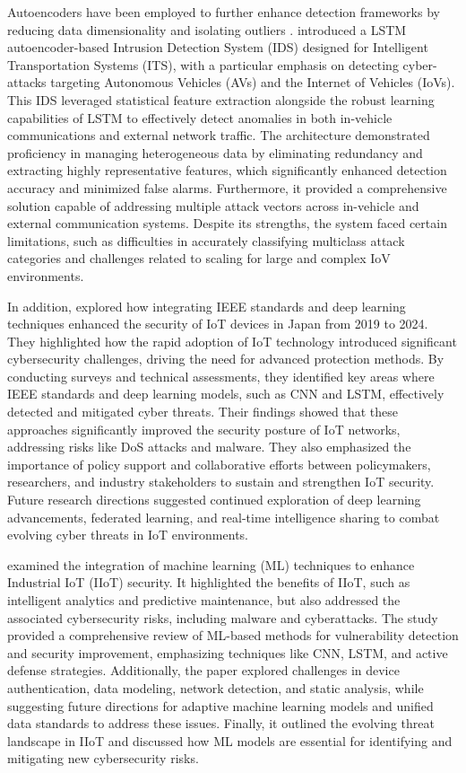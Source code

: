 Autoencoders have been employed to further enhance detection frameworks by reducing data dimensionality and isolating outliers \cite{bensaoud2024survey}. \citet{ashraf2020novel} introduced a LSTM autoencoder-based Intrusion Detection System (IDS) designed for Intelligent Transportation Systems (ITS), with a particular emphasis on detecting cyber-attacks targeting Autonomous Vehicles (AVs) and the Internet of Vehicles (IoVs). This IDS leveraged statistical feature extraction alongside the robust learning capabilities of LSTM to effectively detect anomalies in both in-vehicle communications and external network traffic. The architecture demonstrated proficiency in managing heterogeneous data by eliminating redundancy and extracting highly representative features, which significantly enhanced detection accuracy and minimized false alarms. Furthermore, it provided a comprehensive solution capable of addressing multiple attack vectors across in-vehicle and external communication systems. Despite its strengths, the system faced certain limitations, such as difficulties in accurately classifying multiclass attack categories and challenges related to scaling for large and complex IoV environments.

In addition, \citet{prince2024ieee} explored how integrating IEEE standards and deep learning techniques enhanced the security of IoT devices in Japan from 2019 to 2024. They highlighted how the rapid adoption of IoT technology introduced significant cybersecurity challenges, driving the need for advanced protection methods. By conducting surveys and technical assessments, they identified key areas where IEEE standards and deep learning models, such as CNN and LSTM, effectively detected and mitigated cyber threats. Their findings showed that these approaches significantly improved the security posture of IoT networks, addressing risks like DoS attacks and malware. They also emphasized the importance of policy support and collaborative efforts between policymakers, researchers, and industry stakeholders to sustain and strengthen IoT security. Future research directions suggested continued exploration of deep learning advancements, federated learning, and real-time intelligence sharing to combat evolving cyber threats in IoT environments.

\citet{darabi2024micro} examined the integration of machine learning (ML) techniques to enhance Industrial IoT (IIoT) security. It highlighted the benefits of IIoT, such as intelligent analytics and predictive maintenance, but also addressed the associated cybersecurity risks, including malware and cyberattacks. The study provided a comprehensive review of ML-based methods for vulnerability detection and security improvement, emphasizing techniques like CNN, LSTM, and active defense strategies. Additionally, the paper explored challenges in device authentication, data modeling, network detection, and static analysis, while suggesting future directions for adaptive machine learning models and unified data standards to address these issues. Finally, it outlined the evolving threat landscape in IIoT and discussed how ML models are essential for identifying and mitigating new cybersecurity risks.

